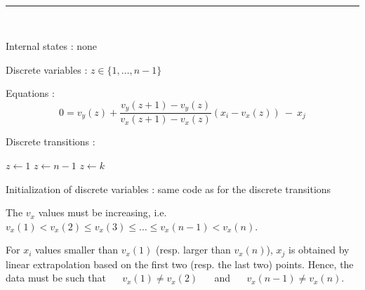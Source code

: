 ~ \hrule ~

Internal states : none

Discrete variables : $z \in \{1, \ldots, n-1 \}$

Equations :
\begin{equation*}
0 = v_y(z)+\frac{v_y(z+1)-v_y(z)}{v_x(z+1)-v_x(z)}\left( x_i-v_x(z) \right) \: - \: x_j
\end{equation*}

\pagebreak
Discrete transitions : 

\hspace*{20ex}\begin{minipage}[t]{15cm}
\begin{algorithmic} 
   \STATE $z \gets 1$
   \STATE $z \gets n-1$
\ELSE
         \STATE $z \gets k$
      \ENDIF
   \ENDFOR
\ENDIF
\end{algorithmic}
\end{minipage}

\vspace{2ex}
Initialization of discrete variables : same code as for the discrete transitions

\vspace{2ex}
The $v_x$ values must be increasing, i.e. $v_x(1) < v_x(2) \le v_x(3) \le \ldots \le v_x(n-1) < v_x(n)$.

For $x_i$ values smaller than $v_x(1)$ (resp. larger than $v_x(n)$), $x_j$ is obtained by linear extrapolation based on the first two (resp. the last two) points. Hence, the data must be such that ~~ $v_x(1) \ne v_x(2)$ ~~ and ~~ $v_x(n-1) \ne v_x(n)$.